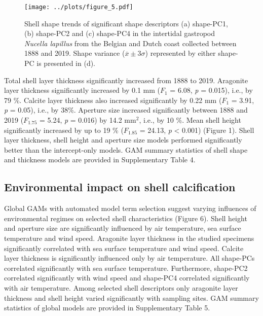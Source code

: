 \documentclass[smallextended]{svjour3}       %
\begin{document}
\begin{figure}
\centering
\texttt{[image: ../plots/figure\_5.pdf]}
\caption{Shell shape trends of significant shape descriptors (a)
shape-PC1, (b) shape-PC2 and (c) shape-PC4 in the intertidal gastropod
\emph{Nucella lapillus} from the Belgian and Dutch coast collected
between 1888 and 2019. Shape variance (\(\overline{x} \pm 3\sigma\))
represented by either shape-PC is presented in (d).}
\end{figure}

Total shell layer thickness significantly increased from 1888 to 2019.
Aragonite layer thickness significantly increased by 0.1 mm (\(F_{1}\) =
6.08, \emph{p} = 0.015), i.e., by 79 \%. Calcite layer thickness also
increased significantly by 0.22 mm (\(F_{1}\) = 3.91, \emph{p} = 0.05),
i.e., by 38\%. Aperture size increased significantly between 1888 and
2019 (\(F_{1.75}\) = 5.24, \emph{p} = 0.016) by 14.2 mm\(^2\), i.e., by
10 \%. Mean shell height significantly increased by up to 19 \%
(\(F_{1.85}\) = 24.13, \emph{p} \textless{} 0.001) (Figure 1). Shell
layer thickness, shell height and aperture size models performed
significantly better than the intercept-only models. GAM summary
statistics of shell shape and thickness models are provided in
Supplementary Table 4.

\hypertarget{environmental-impact-on-shell-calcification}{%
\subsection{Environmental impact on shell
calcification}\label{environmental-impact-on-shell-calcification}}

Global GAMs with automated model term selection suggest varying
influences of environmental regimes on selected shell characteristics
(Figure 6). Shell height and aperture size are significantly influenced
by air temperature, sea surface temperature and wind speed. Aragonite
layer thickness in the studied specimens significantly correlated with
sea surface temperature and wind speed. Calcite layer thickness is
significantly influenced only by air temperature. All shape-PCs
correlated significantly with sea surface temperature. Furthermore,
shape-PC2 correlated significantly with wind speed and shape-PC4
correlated significantly with air temperature. Among selected shell
descriptors only aragonite layer thickness and shell height varied
significantly with sampling sites. GAM summary statistics of global
models are provided in Supplementary Table 5.
\end{document}

